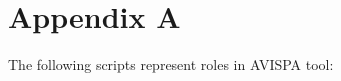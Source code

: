 \documentclass[journal,article,submit,moreauthors,pdftex]{Definitions/mdpi}
\begin{document}
{\begin{tabular}{@{}ll}
\end{tabular}}

\appendix
\section*{Appendix A}
\unskip
\label{sec:appendix}
The following scripts represent roles in AVISPA tool:
\end{document}
